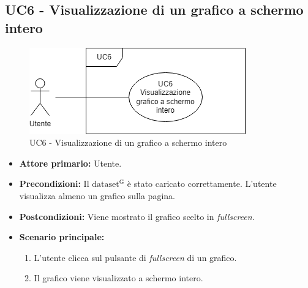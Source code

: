 \newpage


\subsection{UC6 - Visualizzazione di un grafico a schermo intero}
\begin{figure}[h!]
	\centering
	\includegraphics[scale=0.60]{../../assets/visualizzazione_fullscreen.png}
	\caption{UC6 - Visualizzazione di un grafico a schermo intero}
\end{figure}

\begin{itemize}
	\item \textbf{Attore primario:} Utente.
	\item \textbf{Precondizioni:} Il ${\mathrm{dataset^{G}}}$ è stato caricato correttamente. L'utente visualizza almeno un grafico sulla pagina. 
	\item \textbf{Postcondizioni:} 
	Viene mostrato il grafico scelto in \textit{fullscreen}.
	\item \textbf{Scenario principale:}
		\begin{enumerate}
			\item L'utente clicca sul pulsante di \textit{fullscreen} di un grafico.
			\item Il grafico viene visualizzato a schermo intero.
		\end{enumerate}
\end{itemize}
\newpage


